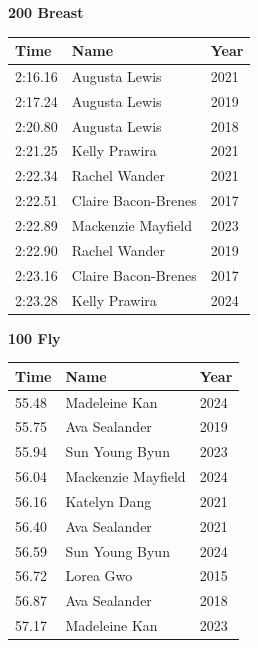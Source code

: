 \vspace{1.2em}
\noindent\begin{minipage}[t]{0.48\textwidth}
\centering
\textbf{\textcolor{teamprimary}{200 Breast}}\par
\vspace{0.5em}
\centering
\small
\renewcommand{\arraystretch}{1.0}
\setlength{\tabcolsep}{4pt}
\begin{tabular}{@{}p{1.8cm}p{3.0cm}p{1.0cm}@{}}
\toprule
\textbf{Time} & \textbf{Name} & \textbf{Year} \\
\midrule
2:16.16 & Augusta Lewis & 2021 \\
2:17.24 & Augusta Lewis & 2019 \\
2:20.80 & Augusta Lewis & 2018 \\
2:21.25 & Kelly Prawira & 2021 \\
2:22.34 & Rachel Wander & 2021 \\
2:22.51 & Claire Bacon-Brenes & 2017 \\
2:22.89 & Mackenzie Mayfield & 2023 \\
2:22.90 & Rachel Wander & 2019 \\
2:23.16 & Claire Bacon-Brenes & 2017 \\
2:23.28 & Kelly Prawira & 2024 \\
\bottomrule
\end{tabular}
\end{minipage}
\hfill
\begin{minipage}[t]{0.48\textwidth}
\centering
\textbf{\textcolor{teamprimary}{100 Fly}}\par
\vspace{0.5em}
\centering
\small
\renewcommand{\arraystretch}{1.0}
\setlength{\tabcolsep}{4pt}
\begin{tabular}{@{}p{1.8cm}p{3.0cm}p{1.0cm}@{}}
\toprule
\textbf{Time} & \textbf{Name} & \textbf{Year} \\
\midrule
55.48 & Madeleine Kan & 2024 \\
55.75 & Ava Sealander & 2019 \\
55.94 & Sun Young Byun & 2023 \\
56.04 & Mackenzie Mayfield & 2024 \\
56.16 & Katelyn Dang & 2021 \\
56.40 & Ava Sealander & 2021 \\
56.59 & Sun Young Byun & 2024 \\
56.72 & Lorea Gwo & 2015 \\
56.87 & Ava Sealander & 2018 \\
57.17 & Madeleine Kan & 2023 \\
\bottomrule
\end{tabular}
\end{minipage}
